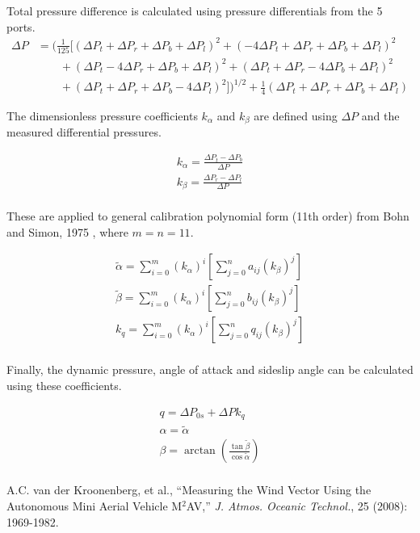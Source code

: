 { %
Total pressure difference is calculated using pressure differentials from the 5 ports. 
\begin{align*}
 \Delta P &= \bigg( \frac{1}{125} [(\Delta P_t + \Delta P_r + \Delta P_b + \Delta P_l)^2 + (-4 \Delta P_t + \Delta P_r + \Delta P_b + \Delta P_l)^2 \\
  & \qquad {} + (\Delta P_t - 4 \Delta P_r + \Delta P_b + \Delta P_l)^2 + (\Delta P_t + \Delta P_r - 4 \Delta P_b + \Delta P_l)^2 \\ 
  & \qquad {} + (\Delta P_t + \Delta P_r + \Delta P_b - 4 \Delta P_l)^2] \bigg)^{1/2}  + \frac{1}{4} (\Delta P_t + \Delta P_r + \Delta P_b + \Delta P_l)
\end{align*}

The dimensionless pressure coefficients $k_\alpha$ and $k_\beta$ are defined using $\Delta P$ and the measured differential pressures.

\begin{gather*}
k_\alpha = \frac{\Delta P_t - \Delta P_b}{\Delta P} \\
k_\beta = \frac{\Delta P_r - \Delta P_l}{\Delta P} \\
\end{gather*}

These are applied to general calibration polynomial form (11th order) from Bohn and Simon, 1975 \cite{bohn1975}, where $m=n=11$. 

\begin{gather*}
\tilde{\alpha} = \sum \limits_{i=0}^m (k_\alpha)^i \left[\sum \limits_{j=0}^n a_{ij}(k_\beta)^j\right] \\
\tilde{\beta} = \sum \limits_{i=0}^m (k_\alpha)^i \left[\sum \limits_{j=0}^n b_{ij}(k_\beta)^j\right] \\ 
k_q = \sum \limits_{i=0}^m (k_\alpha)^i \left[\sum \limits_{j=0}^n q_{ij}(k_\beta)^j\right] \\
\end{gather*}

Finally, the dynamic pressure, angle of attack and sideslip angle can be calculated using these coefficients.

\begin{gather*}
q = \Delta P_{0s} + \Delta P k_q \\
\alpha = \tilde{\alpha} \\
\beta = \arctan\left(\frac{\tan \tilde{\beta}}{\cos \tilde{\alpha}}\right) \\
\end{gather*}



}
{ %

}
{ %

A.C. van der Kroonenberg, et al., ``Measuring the Wind Vector Using the Autonomous Mini Aerial Vehicle M$^2$AV,'' \emph{J. Atmos. Oceanic Technol.}, 25 (2008): 1969-1982. \cite{vandenkroonenberg2008}

}


